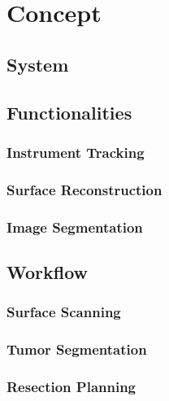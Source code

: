 \chapter{Concept}
\section{System}
\section{Functionalities}
\subsection{Instrument Tracking}
\subsection{Surface Reconstruction}
\subsection{Image Segmentation}
\section{Workflow}
\subsection{Surface Scanning}
\subsection{Tumor Segmentation}
\subsection{Resection Planning}